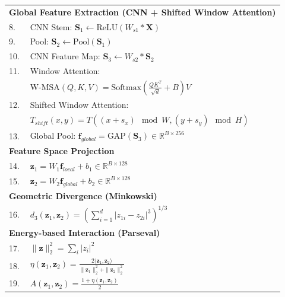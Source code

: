 \documentclass[preprint,12pt]{elsarticle}
\begin{document}
\begin{table}[!h]
\begin{tabular}{@{}ll@{}}
\midrule
\multicolumn{2}{l}{\textbf{Global Feature Extraction (CNN + Shifted Window Attention)}} \\

8. & CNN Stem: $\mathbf{S}_1 \leftarrow \text{ReLU}(W_{s1} * \mathbf{X})$ \\
9. & Pool: $\mathbf{S}_2 \leftarrow \text{Pool}(\mathbf{S}_1)$ \\
10. & CNN Feature Map: $\mathbf{S}_3 \leftarrow W_{s2} * \mathbf{S}_2$ \\

11. & Window Attention: \\
 & \quad $\text{W-MSA}(Q,K,V) = \text{Softmax}\left(\frac{QK^T}{\sqrt{d}} + B\right)V$ \\

12. & Shifted Window Attention: \\
 & \quad $T_{shift}(x,y) = T((x+s_x)\!\!\mod W,(y+s_y)\!\!\mod H)$ \\

13. & Global Pool: $\mathbf{f}_{global} = \text{GAP}(\mathbf{S}_3) \in \mathbb{R}^{B \times 256}$ \\

\midrule
\multicolumn{2}{l}{\textbf{Feature Space Projection}} \\

14. & $\mathbf{z}_1 = W_1 \mathbf{f}_{local} + b_1 \in \mathbb{R}^{B \times 128}$ \\
15. & $\mathbf{z}_2 = W_2 \mathbf{f}_{global} + b_2 \in \mathbb{R}^{B \times 128}$ \\

\midrule
\multicolumn{2}{l}{\textbf{Geometric Divergence (Minkowski)}} \\

16. & $d_3(\mathbf{z}_1,\mathbf{z}_2) =
\left(\sum_{i=1}^{d} |z_{1i}-z_{2i}|^3\right)^{1/3}$ \\

\midrule
\multicolumn{2}{l}{\textbf{Energy-based Interaction (Parseval)}} \\

17. & $\|\mathbf{z}\|_2^2 = \sum_i |z_i|^2$ \\

18. & $\eta(\mathbf{z}_1,\mathbf{z}_2) =
\frac{2\langle \mathbf{z}_1,\mathbf{z}_2 \rangle}
{\|\mathbf{z}_1\|_2^2 + \|\mathbf{z}_2\|_2^2}$ \\

19. & $A(\mathbf{z}_1,\mathbf{z}_2) =
\frac{1+\eta(\mathbf{z}_1,\mathbf{z}_2)}{2}$ \\


\end{tabular}
\end{table}
\end{document}
